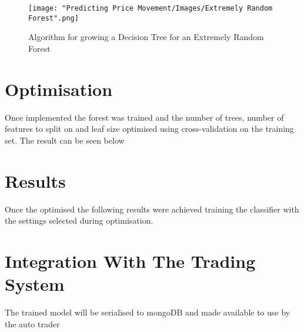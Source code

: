 			\begin{figure}[H]
				\texttt{[image: "Predicting Price Movement/Images/Extremely Random Forest".png]}
				\centering
				\caption{Algorithm for growing a Decision Tree for an Extremely Random Forest}
    				\label{fig:extremelyRandomForestTree}
			\end{figure}		
		
	\section{Optimisation}				
		Once implemented the forest was trained and the number of trees, number of features to split on and leaf size optimised using cross-validation on the training set. The result can be seen below
		
		
	\section{Results}
		Once the optimised the following results were achieved training the classifier with the settings selected during optimisation.
	
	
	\section{Integration With The Trading System}
		The trained model will be serialised to mongoDB and made available to use by the auto trader 	
	

